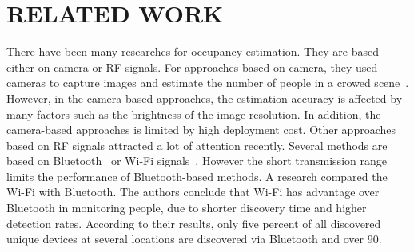 \chapter{RELATED WORK}
There have been many researches for occupancy estimation. They are based either on camera or RF signals.
For approaches based on camera, they used cameras to capture images and estimate the number of people in a crowed scene~\cite{Ma_2013_CVPR,Pe_count}. However, in the camera-based approaches, the estimation accuracy is affected by many factors such as the brightness of the image resolution. In addition, the camera-based approaches is limited by high deployment cost.
Other approaches based on RF signals attracted a lot of attention recently. Several methods are based on Bluetooth~\cite{B_ad_hoc} or Wi-Fi signals~\cite{W_power}. However the short transmission range limits the performance of Bluetooth-based methods. A research compared the Wi-Fi with Bluetooth. The authors conclude that Wi-Fi has advantage over Bluetooth in monitoring people, due to shorter discovery time and higher detection rates\cite{quteprints71808}. According to their results, only
five percent of all discovered unique devices at several locations are discovered via Bluetooth and over 90.
